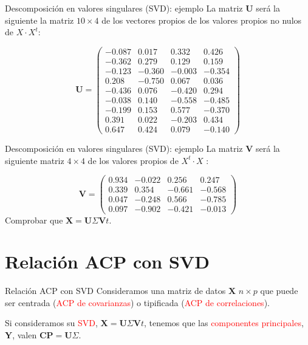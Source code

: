 \documentclass[
  ignorenonframetext,
]{beamer}
\newcommand\red[1]{\textcolor{red}{#1}}
\begin{document}
\begin{frame}{Descomposición en valores singulares (SVD): ejemplo}
\protect\hypertarget{descomposiciuxf3n-en-valores-singulares-svd-ejemplo-4}{}
La matriz \(\mathbf{U}\) será la siguiente la matriz \(10\times 4\) de
los vectores propios de los valores propios no nulos de \(X\cdot X^t\):

\[
\mathbf{U} =\begin{pmatrix}
-0.087 & 0.017 & 0.332 & 0.426 \\ 
  -0.362 & 0.279 & 0.129 & 0.159 \\ 
  -0.123 & -0.360 & -0.003 & -0.354 \\ 
  0.208 & -0.750 & 0.067 & 0.036 \\ 
  -0.436 & 0.076 & -0.420 & 0.294 \\ 
  -0.038 & 0.140 & -0.558 & -0.485 \\ 
  -0.199 & 0.153 & 0.577 & -0.370 \\ 
  0.391 & 0.022 & -0.203 & 0.434 \\ 
  0.647 & 0.424 & 0.079 & -0.140 
  \end{pmatrix}
\]
\end{frame}

\begin{frame}{Descomposición en valores singulares (SVD): ejemplo}
\protect\hypertarget{descomposiciuxf3n-en-valores-singulares-svd-ejemplo-5}{}
La matriz \(\mathbf{V}\) será la siguiente matriz \(4\times 4\) de los
valores propios de \(X^t\cdot X\) :

\[
\mathbf{V} =\begin{pmatrix}
0.934 & -0.022 & 0.256 & 0.247 \\ 
  0.339 & 0.354 & -0.661 & -0.568 \\ 
  0.047 & -0.248 & 0.566 & -0.785 \\ 
  0.097 & -0.902 & -0.421 & -0.013
  \end{pmatrix}
\] Comprobar que \(\mathbf{X}=\mathbf{U}\Sigma\mathbf{V}t\).
\end{frame}

\hypertarget{relaciuxf3n-acp-con-svd}{%
\section{Relación ACP con SVD}\label{relaciuxf3n-acp-con-svd}}

\begin{frame}{Relación ACP con SVD}
\protect\hypertarget{relaciuxf3n-acp-con-svd-1}{}
Consideramos una matriz de datos \(\mathbf{X}\) \(n\times p\) que puede
ser centrada (\red{ACP de covarianzas}) o tipificada
(\red{ACP de correlaciones}).

Si consideramos su \red{SVD},
\(\mathbf{X}=\mathbf{U}\Sigma\mathbf{V}t\), tenemos que las
\red{componentes principales}, \(\mathbf{Y}\), valen
\(\mathbf{CP}=\mathbf{U}\Sigma\).
\end{frame}
\end{document}
